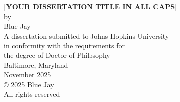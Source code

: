 \begin{titlepage}
\thispagestyle{empty}
\begin{center}
    \doublespacing
    \vspace*{1.5in} 
    {\bf \Large [YOUR DISSERTATION TITLE IN ALL CAPS]} \\ 
    \vfill 
    {\Large by} \\ 
    {\Large Blue Jay}\\ 
    \vfill 
    {\large A dissertation submitted to Johns Hopkins University\\ in conformity with the requirements for\\ the degree of Doctor of Philosophy\\} 
    \vfill 
    {\large Baltimore, Maryland} \\ 
    {\large November 2025} \\ 
    \vfill
    {\large \copyright{} 2025 Blue Jay } \\ 
    {\large All rights reserved} \\ 
    \vfill
\end{center}
\newpage  
\end{titlepage}
